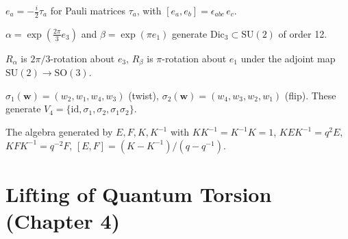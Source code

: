 \begin{definition}
  \label{def:su2-basis}
  $e_a = -\tfrac{i}{2}\tau_a$ for Pauli matrices $\tau_a$,
  with $[e_a, e_b] = \epsilon_{abc}\,e_c$.
\end{definition}

\begin{definition}
  \label{def:su2-generators}
  $\alpha = \exp(\tfrac{2\pi}{3} e_3)$ and $\beta = \exp(\pi e_1)$
  generate $\mathrm{Dic}_3 \subset \mathrm{SU}(2)$ of order 12.
\end{definition}

\begin{definition}
  \label{def:so3-generators}
  $R_\alpha$ is $2\pi/3$-rotation about $e_3$,
  $R_\beta$ is $\pi$-rotation about $e_1$ under the adjoint map
  $\mathrm{SU}(2) \to \mathrm{SO}(3)$.
\end{definition}

\begin{definition}
  \label{def:braid-twist-flip}
  $\sigma_1(\mathbf{w}) = (w_2,w_1,w_4,w_3)$ (twist),
  $\sigma_2(\mathbf{w}) = (w_4,w_3,w_2,w_1)$ (flip).
  These generate $V_4 = \{\mathrm{id}, \sigma_1, \sigma_2, \sigma_1\sigma_2\}$.
\end{definition}

\begin{definition}
  \label{def:quantum-su2}
  The algebra generated by $E, F, K, K^{-1}$ with
  $KK^{-1} = K^{-1}K = 1$, $KEK^{-1} = q^2 E$,
  $KFK^{-1} = q^{-2} F$, $[E,F] = (K - K^{-1})/(q - q^{-1})$.
\end{definition}


\chapter{Lifting of Quantum Torsion (Chapter 4)}

